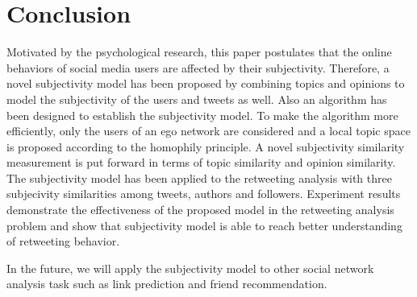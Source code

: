 \documentclass{acm_proc_article-sp}
\begin{document}
\section{Conclusion}
Motivated by the psychological research, this paper postulates that the online behaviors of social media users are affected by their subjectivity. Therefore, a novel subjectivity model has been proposed by combining topics and opinions to model the subjectivity of the users and tweets as well. Also an algorithm has been designed to establish the subjectivity model. To make the algorithm more efficiently, only the users of an ego network are considered and a local topic space is proposed according to the homophily principle. A novel subjectivity similarity measurement is put forward in terms of topic similarity and opinion similarity. The subjectivity model has been applied to the retweeting analysis with three subjecivity similarities among tweets, authors and followers. 
Experiment results demonstrate the effectiveness of the proposed model in the retweeting analysis problem and show that subjectivity model is able to reach better understanding of retweeting behavior. 

In the future, we will apply the subjectivity model to other social network analysis task such as link prediction and friend recommendation. 


\end{document}
